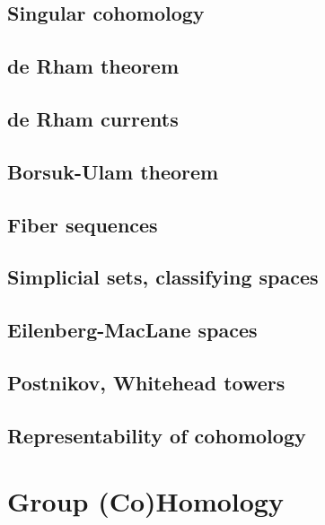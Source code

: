 \subsection{Singular cohomology}

\subsection{de Rham theorem}


\subsection{de Rham currents}

\subsection{Borsuk-Ulam theorem}


\subsection{Fiber sequences}

\subsection{Simplicial sets, classifying spaces}


\subsection{Eilenberg-MacLane spaces}



\subsection{Postnikov, Whitehead towers}


\subsection{Representability of cohomology}






\clearpage
\section{Group (Co)Homology}

